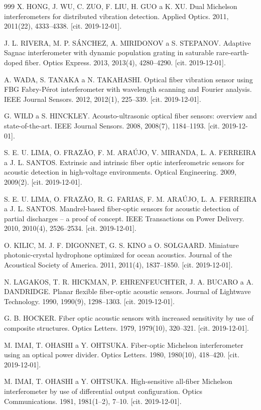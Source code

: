\begin{thebibliography}{999}
	X. HONG, J. WU, C. ZUO, F. LIU, H. GUO a K. XU. Dual Michelson interferometers for distributed vibration detection. Applied Optics. 2011, 2011(22), 4333–4338. [cit. 2019-12-01].

	J. L. RIVERA, M. P. SÁNCHEZ, A. MIRIDONOV a S. STEPANOV. Adaptive Sagnac interferometer with dynamic population grating in saturable rare-earth-doped fiber. Optics Express. 2013, 2013(4), 4280–4290. [cit. 2019-12-01].

	A. WADA, S. TANAKA a N. TAKAHASHI. Optical fiber vibration sensor using FBG Fabry-Pérot interferometer with wavelength scanning and Fourier analysis. IEEE Journal Sensors. 2012, 2012(1), 225–339. [cit. 2019-12-01].
	
	G. WILD a S. HINCKLEY. Acousto-ultrasonic optical fiber sensors: overview and state-of-the-art. IEEE Journal Sensors. 2008, 2008(7), 1184–1193. [cit. 2019-12-01].
	
	S. E. U. LIMA, O. FRAZÃO, F. M. ARAÚJO, V. MIRANDA, L. A. FERREIRA a J. L. SANTOS. Extrinsic and intrinsic fiber optic interferometric sensors for acoustic detection in high-voltage environments. Optical Engineering. 2009, 2009(2). [cit. 2019-12-01].

	S. E. U. LIMA, O. FRAZÃO, R. G. FARIAS, F. M. ARAÚJO, L. A. FERREIRA a J. L. SANTOS. Mandrel-based fiber-optic sensors for acoustic detection of partial discharges – a proof of concept. IEEE Transactions on Power Delivery. 2010, 2010(4), 2526–2534. [cit. 2019-12-01].

	O. KILIC, M. J. F. DIGONNET, G. S. KINO a O. SOLGAARD. Miniature photonic-crystal hydrophone optimized for ocean acoustics. Journal of the Acoustical Society of America. 2011, 2011(4), 1837–1850. [cit. 2019-12-01].

	N. LAGAKOS, T. R. HICKMAN, P. EHRENFEUCHTER, J. A. BUCARO a A. DANDRIDGE. Planar flexible fiber-optic acoustic sensors. Journal of Lightwave Technology. 1990, 1990(9), 1298–1303. [cit. 2019-12-01].

	G. B. HOCKER. Fiber optic acoustic sensors with increased sensitivity by use of composite structures. Optics Letters. 1979, 1979(10), 320–321. [cit. 2019-12-01].

	M. IMAI, T. OHASHI a Y. OHTSUKA. Fiber-optic Michelson interferometer using an optical power divider. Optics Letters. 1980, 1980(10), 418–420. [cit. 2019-12-01].

	M. IMAI, T. OHASHI a Y. OHTSUKA. High-sensitive all-fiber Michelson interferometer by use of differential output configuration. Optics Communications. 1981, 1981(1–2), 7–10. [cit. 2019-12-01].


\end{thebibliography}
